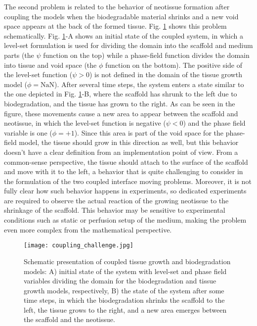 The second problem is related to the behavior of neotissue formation after coupling the models when the biodegradable material shrinks and a new void space appears at the back of the formed tissue. Fig. \ref{fig:tissue_coupling_challenge} shows this problem schematically. Fig. \ref{fig:tissue_coupling_challenge}-A shows an initial state of the coupled system, in which a level-set formulation is used for dividing the domain into the scaffold and medium parts (the $\psi$ function on the top) while a phase-field function divides the domain into tissue and void space (the $\phi$ function on the bottom). The positive side of the level-set function ($\psi > 0$) is not defined in the domain of the tissue growth model ($\phi=\text{NaN}$). After several time steps, the system enters a state similar to the one depicted in Fig. \ref{fig:tissue_coupling_challenge}-B, where the scaffold has shrunk to the left due to biodegradation, and the tissue has grown to the right. As can be seen in the figure, these movements cause a new area to appear between the scaffold and neotissue, in which the level-set function is negative ($\psi < 0$) and the phase field variable is one ($\phi=+1$). Since this area is part of the void space for the phase-field model, the tissue should grow in this direction as well, but this behavior doesn't have a clear definition from an implementation point of view. From a common-sense perspective, the tissue should attach to the surface of the scaffold and move with it to the left, a behavior that is quite challenging to consider in the formulation of the two coupled interface moving problems. Moreover, it is not fully clear how such behavior happens in experiments, so dedicated experiments are required to observe the actual reaction of the growing neotissue to the shrinkage of the scaffold. This behavior may be sensitive to experimental conditions such as static or perfusion setup of the medium, making the problem even more complex from the mathematical perspective.


\begin{figure}
\medskip
\centering
\texttt{[image: coupling\_challenge.jpg]}
\caption[Schematic presentation of coupled tissue growth and biodegradation models]{Schematic presentation of coupled tissue growth and biodegradation models: A) initial state of the system with level-set and phase field variables dividing the domain for the biodegradation and tissue growth models, respectively, B) the state of the system after some time steps, in which the biodegradation shrinks the scaffold to the left, the tissue grows to the right, and a new area emerges between the scaffold and the neotissue.}
\label{fig:tissue_coupling_challenge}
\end{figure}

